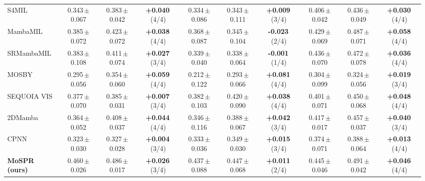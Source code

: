 \begin{tabular}{lccccccccc}
S4MIL & 0.343\,{\tiny$\pm$0.067} & 0.383\,{\tiny$\pm$0.042} & \textbf{+0.040}\,{\tiny(4/4)} & 0.334\,{\tiny$\pm$0.086} & 0.343\,{\tiny$\pm$0.111} & \textbf{+0.009}\,{\tiny(3/4)} & 0.406\,{\tiny$\pm$0.042} & 0.436\,{\tiny$\pm$0.049} & \textbf{+0.030}\,{\tiny(4/4)}\\
MambaMIL & 0.385\,{\tiny$\pm$0.072} & 0.423\,{\tiny$\pm$0.072} & \textbf{+0.038}\,{\tiny(4/4)} & 0.368\,{\tiny$\pm$0.087} & 0.345\,{\tiny$\pm$0.104} & \textbf{-0.023}\,{\tiny(2/4)} & 0.429\,{\tiny$\pm$0.069} & 0.487\,{\tiny$\pm$0.071} & \textbf{+0.058}\,{\tiny(4/4)}\\
SRMambaMIL & 0.383\,{\tiny$\pm$0.108} & 0.411\,{\tiny$\pm$0.074} & \textbf{+0.027}\,{\tiny(3/4)} & 0.339\,{\tiny$\pm$0.040} & 0.338\,{\tiny$\pm$0.064} & \textbf{-0.001}\,{\tiny(1/4)} & 0.436\,{\tiny$\pm$0.070} & 0.472\,{\tiny$\pm$0.078} & \textbf{+0.036}\,{\tiny(4/4)}\\
MOSBY & 0.295\,{\tiny$\pm$0.056} & 0.354\,{\tiny$\pm$0.060} & \textbf{+0.059}\,{\tiny(4/4)} & 0.212\,{\tiny$\pm$0.122} & 0.293\,{\tiny$\pm$0.066} & \textbf{+0.081}\,{\tiny(4/4)} & 0.304\,{\tiny$\pm$0.099} & 0.324\,{\tiny$\pm$0.056} & \textbf{+0.019}\,{\tiny(3/4)}\\
SEQUOIA VIS & 0.377\,{\tiny$\pm$0.070} & 0.385\,{\tiny$\pm$0.031} & \textbf{+0.007}\,{\tiny(3/4)} & 0.382\,{\tiny$\pm$0.103} & 0.420\,{\tiny$\pm$0.090} & \textbf{+0.038}\,{\tiny(4/4)} & 0.401\,{\tiny$\pm$0.071} & 0.450\,{\tiny$\pm$0.068} & \textbf{+0.048}\,{\tiny(4/4)}\\
2DMamba & 0.364\,{\tiny$\pm$0.052} & 0.408\,{\tiny$\pm$0.037} & \textbf{+0.044}\,{\tiny(4/4)} & 0.346\,{\tiny$\pm$0.116} & 0.388\,{\tiny$\pm$0.067} & \textbf{+0.042}\,{\tiny(3/4)} & 0.417\,{\tiny$\pm$0.017} & 0.457\,{\tiny$\pm$0.037} & \textbf{+0.040}\,{\tiny(3/4)}\\
CPNN & 0.323\,{\tiny$\pm$0.030} & 0.327\,{\tiny$\pm$0.028} & \textbf{+0.004}\,{\tiny(3/4)} & 0.333\,{\tiny$\pm$0.036} & 0.349\,{\tiny$\pm$0.030} & \textbf{+0.015}\,{\tiny(3/4)} & 0.374\,{\tiny$\pm$0.071} & 0.388\,{\tiny$\pm$0.064} & \textbf{+0.013}\,{\tiny(4/4)}\\
\textbf{MoSPR (ours)} & 0.460\,{\tiny$\pm$0.026} & 0.486\,{\tiny$\pm$0.017} & \textbf{+0.026}\,{\tiny(3/4)} & 0.437\,{\tiny$\pm$0.088} & 0.447\,{\tiny$\pm$0.068} & \textbf{+0.011}\,{\tiny(2/4)} & 0.445\,{\tiny$\pm$0.046} & 0.491\,{\tiny$\pm$0.042} & \textbf{+0.046}\,{\tiny(4/4)}\\
\bottomrule
\end{tabular}
